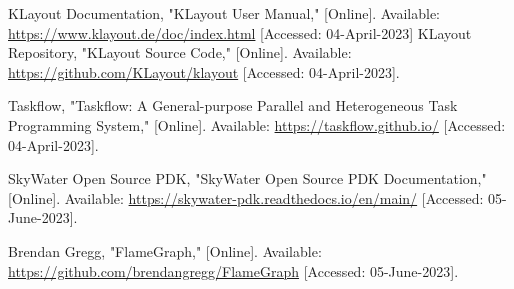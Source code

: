 \documentclass[sigconf]{acmart}
\begin{document}
    \begin{thebibliography}{9}
        KLayout Documentation,
        "KLayout User Manual," [Online].
        Available: \url{https://www.klayout.de/doc/index.html} [Accessed: 04-April-2023]
        KLayout Repository,
        "KLayout Source Code," [Online].
        Available: \url{https://github.com/KLayout/klayout} [Accessed: 04-April-2023].
        
        Taskflow,
        "Taskflow: A General-purpose Parallel and Heterogeneous Task Programming System," [Online].
        Available: \url{https://taskflow.github.io/} [Accessed: 04-April-2023].
    
        SkyWater Open Source PDK,
        "SkyWater Open Source PDK Documentation," [Online].
        Available: \url{https://skywater-pdk.readthedocs.io/en/main/} [Accessed: 05-June-2023].
        
        Brendan Gregg,
        "FlameGraph," [Online].
        Available: \url{https://github.com/brendangregg/FlameGraph} [Accessed: 05-June-2023].

    \end{thebibliography}

    
  
  
\end{document}
